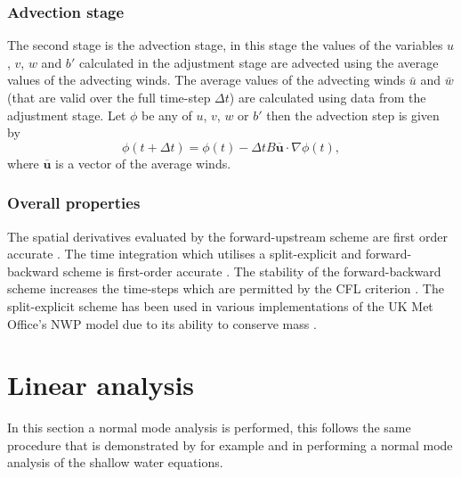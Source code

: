 \documentclass[times]{qjrms4}
\begin{document}
\subsubsection*{Advection stage}

The second stage is the advection stage, in this stage the values of the variables $u$, $v$, $w$ and 
$b'$ calculated in the adjustment stage are advected using the average values of the advecting winds. 
The average values of the advecting winds $\bar u$ and $\bar w$ (that are valid over the full 
time-step $\Delta t$) are calculated using data from the adjustment stage.
Let $\phi$ be any of $u$, $v$, $w$ or $b'$ then the advection step is given by
  \begin{equation}
    \phi(t + \Delta t) = \phi(t) - \Delta t B \overline {\mathbf u} \cdot \nabla \phi(t),
  \end{equation}
where $\overline {\mathbf u}$ is a vector of the average winds. 

\subsubsection*{Overall properties}



The spatial derivatives evaluated by the forward-upstream scheme are first order accurate
\citep{num_rec}. 
The time integration which utilises a split-explicit and forward-backward scheme is first-order
accurate \citep{ames, gadd}. 
The stability of the forward-backward scheme increases the time-steps which are  permitted by the CFL criterion \citep{ames}. The split-explicit scheme has been
used in various implementations of the UK Met Office's NWP model due to its ability to
conserve mass \citep{gadd, cullen_spex}.


\section{Linear analysis}\label{linanal}

In this section a normal mode analysis is performed, this follows the same 
procedure that is demonstrated by for example \cite{daley_1991} and \cite{cullen_book} 
in performing a normal mode analysis of the shallow water equations. 
\end{document}
